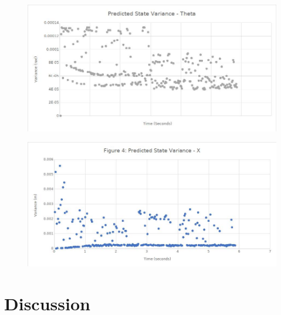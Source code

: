 \documentclass[journal]{IEEEtran}
\begin{document}
\begin{figure}[!t]%
\centering
\includegraphics[width=0.9\linewidth]{Figures/6-pred-state-var-theta.jpg}
\caption{}
\label{fig:6}
\end{figure}

\begin{figure}[!t]%
\centering
\includegraphics[width=0.9\linewidth]{Figures/7-landmarks-over-time.jpg}
\caption{}
\label{fig:7}
\end{figure}


\section{Discussion}







%
%
\end{document}
